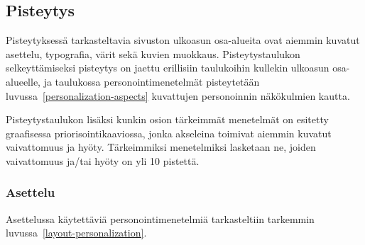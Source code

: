 \documentclass[finnish, 12pt, a4paper, elec, utf8, a-1b]{aaltothesis}
\begin{document}
\subsection{Pisteytys}

Pisteytyksessä tarkasteltavia sivuston ulkoasun osa-alueita ovat aiemmin
kuvatut asettelu, typografia, värit sekä kuvien muokkaus.
Pisteytystaulukon selkeyttämiseksi pisteytys on jaettu erillisiin taulukoihin
kullekin ulkoasun osa-alueelle, ja taulukossa personointimenetelmät pisteytetään
luvussa~\ref{personalization-aspects} kuvattujen personoinnin näkökulmien
kautta.

Pisteytystaulukon lisäksi kunkin osion tärkeimmät menetelmät on esitetty
graafisessa priorisointikaaviossa, jonka akseleina toimivat aiemmin kuvatut
vaivattomuus ja hyöty. Tärkeimmiksi menetelmiksi lasketaan ne, joiden
vaivattomuus ja/tai hyöty on yli 10 pistettä.

\subsubsection{Asettelu}

Asettelussa käytettäviä personointimenetelmiä tarkasteltiin tarkemmin
luvussa~\ref{layout-personalization}.
\end{document}
